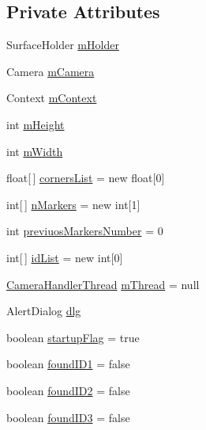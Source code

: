 \subsection*{Private Attributes}
\begin{DoxyCompactItemize}
\item 
Surface\+Holder \hyperlink{classsdem_1_1unimore_1_1com_1_1sdemapp_1_1_camera_view_ae76cc9a21aaf87eeec89eeab7098197b}{m\+Holder}
\item 
Camera \hyperlink{classsdem_1_1unimore_1_1com_1_1sdemapp_1_1_camera_view_a9cff9932f9c42f306bf742f1a5202b04}{m\+Camera}
\item 
Context \hyperlink{classsdem_1_1unimore_1_1com_1_1sdemapp_1_1_camera_view_a277f9e02a27eaebc0d06166aa6fdcd3b}{m\+Context}
\item 
int \hyperlink{classsdem_1_1unimore_1_1com_1_1sdemapp_1_1_camera_view_ab8c6faf182aab5fa2a4fb732046d69d5}{m\+Height}
\item 
int \hyperlink{classsdem_1_1unimore_1_1com_1_1sdemapp_1_1_camera_view_a3d402c5574142241cb45c88209f3cd05}{m\+Width}
\item 
float\mbox{[}$\,$\mbox{]} \hyperlink{classsdem_1_1unimore_1_1com_1_1sdemapp_1_1_camera_view_ae79d568475e05039fa7eeaa71c1fa4d7}{corners\+List} = new float\mbox{[}0\mbox{]}
\item 
int\mbox{[}$\,$\mbox{]} \hyperlink{classsdem_1_1unimore_1_1com_1_1sdemapp_1_1_camera_view_ae6e04f93a296446a1d14a00fcd0483b4}{n\+Markers} = new int\mbox{[}1\mbox{]}
\item 
int \hyperlink{classsdem_1_1unimore_1_1com_1_1sdemapp_1_1_camera_view_ad81a0ee28c133e298f3f06dcd7d4b020}{previuos\+Markers\+Number} = 0
\item 
int\mbox{[}$\,$\mbox{]} \hyperlink{classsdem_1_1unimore_1_1com_1_1sdemapp_1_1_camera_view_a93a3fb2662449c848c4e853aa41d603c}{id\+List} = new int\mbox{[}0\mbox{]}
\item 
\hyperlink{classsdem_1_1unimore_1_1com_1_1sdemapp_1_1_camera_view_1_1_camera_handler_thread}{Camera\+Handler\+Thread} \hyperlink{classsdem_1_1unimore_1_1com_1_1sdemapp_1_1_camera_view_a9ffad8e816f47e03bc0c24976b6eabcd}{m\+Thread} = null
\item 
Alert\+Dialog \hyperlink{classsdem_1_1unimore_1_1com_1_1sdemapp_1_1_camera_view_a16c343ddd35e05221fe34dda8901b514}{dlg}
\item 
boolean \hyperlink{classsdem_1_1unimore_1_1com_1_1sdemapp_1_1_camera_view_a03232dc6ad762f65c82ad343ec3f2e61}{startup\+Flag} = true
\item 
boolean \hyperlink{classsdem_1_1unimore_1_1com_1_1sdemapp_1_1_camera_view_a2fc0e0fbf2913dad2f579a58be29eb90}{found\+I\+D1} = false
\item 
boolean \hyperlink{classsdem_1_1unimore_1_1com_1_1sdemapp_1_1_camera_view_ae9b4adebfb828f92c072643bac1789bd}{found\+I\+D2} = false
\item 
boolean \hyperlink{classsdem_1_1unimore_1_1com_1_1sdemapp_1_1_camera_view_ac34c35419c994bb836d0920611bfd614}{found\+I\+D3} = false
\end{DoxyCompactItemize}
